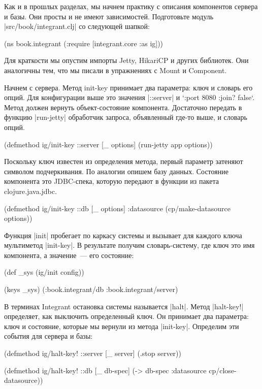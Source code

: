 Как и в прошлых разделах, мы начнем практику с описания компонентов сервера и
базы. Они просты и не имеют зависимостей. Подготовьте модуль
\spverb|src/book/integrant.clj| со следующей шапкой:

\begin{code}
(ns book.integrant
  (:require [integrant.core :as ig]))
\end{code}

Для краткости мы опустим импорты Jetty, HikariCP и других библиотек. Они
аналогичны тем, что мы писали в упражнениях с Mount и Component.

Начнем с сервера. Метод init-key принимает два параметра: ключ и словарь его
опций. Для конфигурации выше это значения \spverb|::server| и `{:port 8080 :join?
false}`. Метод должен вернуть объект-состояние компонента. Достаточно передать в
функцию \spverb|run-jetty| обработчик запроса, объявленный где-то выше, и словарь
опций.

\begin{code}
(defmethod ig/init-key ::server
  [_ options]
  (run-jetty app options))
\end{code}

Поскольку ключ известен из определения метода, первый параметр затеняют символом
подчеркивания. По аналогии опишем базу данных. Состояние компонента это
JDBC-спека, которую передают в функции из пакета clojure.java.jdbc.

\begin{code}
(defmethod ig/init-key ::db
  [_ options]
  {:datasource (cp/make-datasource options)})
\end{code}

Функция \spverb|init| пробегает по каркасу системы и вызывает для каждого ключа
мультиметод \spverb|init-key|. В результате получим словарь-систему, где ключ это имя
компонента, а значение~--- его состояние:

\begin{code}
(def _sys (ig/init config))

(keys _sys)
(:book.integrant/db :book.integrant/server)
\end{code}

В терминах Integrant остановка системы называется \spverb|halt|. Метод \spverb|halt-key!|
определяет, как выключить определенный ключ. Он принимает два параметра: ключ и
состояние, которые мы вернули из метода \spverb|init-key|. Определим эти события для
сервера и базы:

\begin{code}
(defmethod ig/halt-key! ::server [_ server]
  (.stop server))

(defmethod ig/halt-key! ::db [_ db-spec]
  (-> db-spec :datasource cp/close-datasource))
\end{code}

